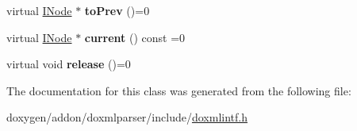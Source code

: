 \begin{DoxyCompactItemize}
\item 
\mbox{\label{class_i_node_iterator_a484ecacf81a01d3c7400b019b23a74c3}} 
virtual \mbox{\hyperlink{class_i_node}{I\+Node}} $\ast$ {\bfseries to\+Prev} ()=0
\item 
\mbox{\label{class_i_node_iterator_a786c0a482f472d6436839bbf08484a81}} 
virtual \mbox{\hyperlink{class_i_node}{I\+Node}} $\ast$ {\bfseries current} () const =0
\item 
\mbox{\label{class_i_node_iterator_a17249e1a53de824e53367fdb4ad7b201}} 
virtual void {\bfseries release} ()=0
\end{DoxyCompactItemize}


The documentation for this class was generated from the following file\+:\begin{DoxyCompactItemize}
\item 
doxygen/addon/doxmlparser/include/\mbox{\hyperlink{include_2doxmlintf_8h}{doxmlintf.\+h}}\end{DoxyCompactItemize}
